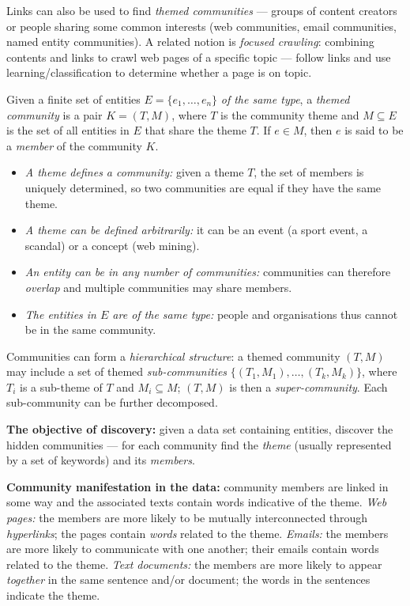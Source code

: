 \documentclass[11pt,a4paper]{article}
\theoremstyle{definition}
\begin{document}
Links can also be used to find \emph{themed communities} --- groups of content creators or people
sharing some common interests (web communities, email communities, named entity communities). A
related notion is \emph{focused crawling}: combining contents and links to crawl web pages of a
specific topic --- follow links and use learning/classification to determine whether a page is on
topic.

\begin{defbox}
Given a finite set of entities $E=\{e_1,\dots,e_n\}$ \emph{of the same type}, a \emph{themed
community} is a pair $K=(T,M)$, where $T$ is the community theme and $M\subseteq E$ is the set of all
entities in $E$ that share the theme $T$. If $e\in M$, then $e$ is said to be a \emph{member} of the
community $K$.
\begin{itemize}
\item \emph{A theme defines a community:} given a theme $T$, the set of members is uniquely
      determined, so two communities are equal if they have the same theme.
\item \emph{A theme can be defined arbitrarily:} it can be an event (a sport event, a scandal) or a
      concept (web mining).
\item \emph{An entity can be in any number of communities:} communities can therefore \emph{overlap}
      and multiple communities may share members.
\item \emph{The entities in $E$ are of the same type:} people and organisations thus cannot be in the
      same community.
\end{itemize}
Communities can form a \emph{hierarchical structure}: a themed community $(T,M)$ may include a set of
themed \emph{sub-communities} $\{(T_1,M_1),\dots,(T_k,M_k)\}$, where $T_i$ is a sub-theme of $T$ and
$M_i\subseteq M$; $(T,M)$ is then a \emph{super-community}. Each sub-community can be further
decomposed.

\textbf{The objective of discovery:} given a data set containing entities, discover the hidden
communities --- for each community find the \emph{theme} (usually represented by a set of keywords) and
its \emph{members}.
\end{defbox}

\textbf{Community manifestation in the data:} community members are linked in some way and the
associated texts contain words indicative of the theme. \emph{Web pages:} the members are more likely
to be mutually interconnected through \emph{hyperlinks}; the pages contain \emph{words} related to the
theme. \emph{Emails:} the members are more likely to communicate with one another; their emails contain
words related to the theme. \emph{Text documents:} the members are more likely to appear
\emph{together} in the same sentence and/or document; the words in the sentences indicate the theme.
\end{document}
